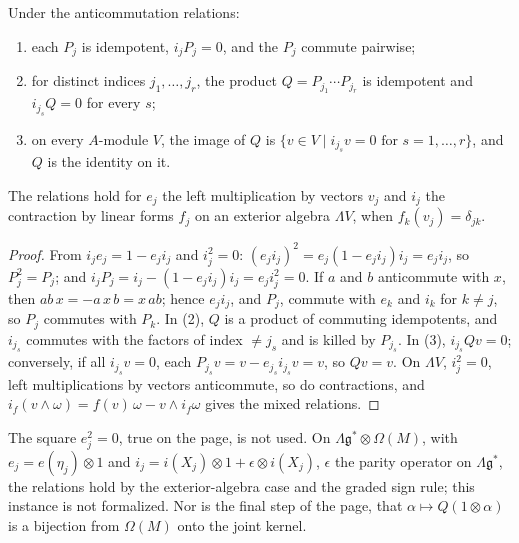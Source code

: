 \begin{encadre}
\begin{theoreme}\label{thm:quillen-1982-13}
Under the anticommutation relations:
\begin{enumerate}
\item each $P_j$ is idempotent, $i_j P_j = 0$, and the $P_j$ commute pairwise;
\item for distinct indices $j_1, \ldots, j_r$, the product $Q = P_{j_1} \cdots P_{j_r}$ is idempotent and $i_{j_s} Q = 0$ for every $s$;
\item on every $A$-module $V$, the image of $Q$ is $\{v \in V \mid i_{j_s} v = 0 \text{ for } s = 1, \ldots, r\}$, and $Q$ is the identity on it.
\end{enumerate}
The relations hold for $e_j$ the left multiplication by vectors $v_j$ and $i_j$ the contraction by linear forms $f_j$ on an exterior algebra $\Lambda V$, when $f_k(v_j) = \delta_{jk}$.
\end{theoreme}
\end{encadre}

\begin{proof}
From $i_j e_j = 1 - e_j i_j$ and $i_j^2 = 0$: $(e_j i_j)^2 = e_j (1 - e_j i_j) i_j = e_j i_j$, so $P_j^2 = P_j$; and $i_j P_j = i_j - (1 - e_j i_j) i_j = e_j i_j^2 = 0$. If $a$ and $b$ anticommute with $x$, then $ab\,x = -a\,x\,b = x\,ab$; hence $e_j i_j$, and $P_j$, commute with $e_k$ and $i_k$ for $k \ne j$, so $P_j$ commutes with $P_k$. In (2), $Q$ is a product of commuting idempotents, and $i_{j_s}$ commutes with the factors of index $\ne j_s$ and is killed by $P_{j_s}$. In (3), $i_{j_s} Q v = 0$; conversely, if all $i_{j_s} v = 0$, each $P_{j_s} v = v - e_{j_s} i_{j_s} v = v$, so $Qv = v$. On $\Lambda V$, $i_j^2 = 0$, left multiplications by vectors anticommute, so do contractions, and $i_f(v \wedge \omega) = f(v)\,\omega - v \wedge i_f\omega$ gives the mixed relations.
\end{proof}

\noindent The square $e_j^2 = 0$, true on the page, is not used. On $\Lambda\mathfrak g^* \otimes \Omega(M)$, with $e_j = e(\eta_j) \otimes 1$ and $i_j = i(X_j) \otimes 1 + \epsilon \otimes i(X_j)$, $\epsilon$ the parity operator on $\Lambda\mathfrak g^*$, the relations hold by the exterior-algebra case and the graded sign rule; this instance is not formalized. Nor is the final step of the page, that $\alpha \mapsto Q(1 \otimes \alpha)$ is a bijection from $\Omega(M)$ onto the joint kernel.

